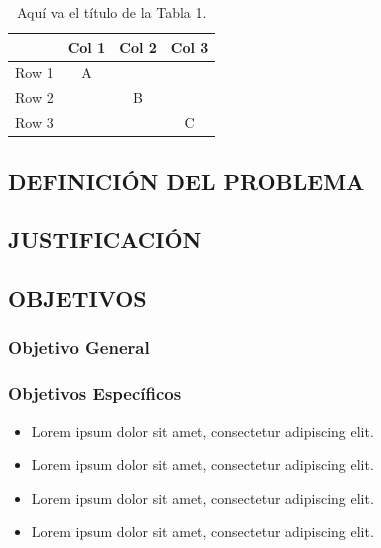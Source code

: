 \documentclass[12pt,twoside]{article}
\providecommand{\tabularnewline}{\\}
\begin{document}
\begin{table}[H]
\noindent \begin{raggedright}
\caption{Aquí va el título de la Tabla 1.}

\par\end{raggedright}

\noindent \centering{}%
\begin{tabular}{|c|c|c|c|}
\hline 
 & Col 1 & Col 2 & Col 3\tabularnewline
\hline 
\hline 
Row 1 & A &  & \tabularnewline
\hline 
Row 2 &  & B & \tabularnewline
\hline 
Row 3 &  &  & C\tabularnewline
\hline 
\end{tabular}
\end{table}

\lipsum[1-2]


\subsection{\label{sec:definicion_del_problema}DEFINICIÓN DEL PROBLEMA}
\lipsum[1-5]


\subsection{\label{sec:justificacion}JUSTIFICACIÓN}
\lipsum[1-5]


\subsection{\label{sec:objetivos}OBJETIVOS}
\lipsum[1-1]

\subsubsection{\label{sub:objetivo_general}Objetivo General}
\lipsum[1-1]


\subsubsection{\label{sub:objetivos_especificos}Objetivos Específicos}
\begin{itemize}
\item Lorem ipsum dolor sit amet, consectetur adipiscing elit.
\item Lorem ipsum dolor sit amet, consectetur adipiscing elit.
\item Lorem ipsum dolor sit amet, consectetur adipiscing elit.
\item Lorem ipsum dolor sit amet, consectetur adipiscing elit.
\end{itemize}
\end{document}
